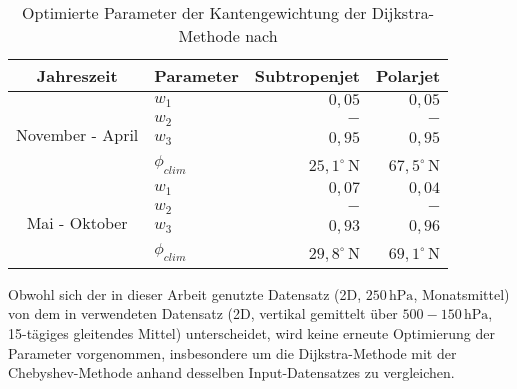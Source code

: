 \begin{table}[htb]
  \caption[Parameter der Kantengewichtung der Dijkstra-Methode]{Optimierte Parameter der Kantengewichtung der Dijkstra-Methode nach \citet{molnos-2017}}
\centering
\begin{tabular}{|cl|rr|}
  \hline
  Jahreszeit & Parameter & Subtropenjet & Polarjet \\
  \hline
  \multirow{4}{*}{November - April} 
    & $w_1$ & $0,05$ & $0,05$ \\
    & $w_2$ & $-$ & $-$ \\
    & $w_3$ & $0,95$ & $0,95$ \\
    & $\phi_{clim}$ & $25,1^{\circ}$\,N & $67,5^{\circ}$\,N \\
  \hline
  \multirow{4}{*}{Mai - Oktober} 
    & $w_1$ & $0,07$ & $0,04$ \\
    & $w_2$ & $-$ & $-$ \\
    & $w_3$ & $0,93$ & $0,96$ \\
    & $\phi_{clim}$ & $29,8^{\circ}$\,N & $69,1^{\circ}$\,N \\
  \hline
\end{tabular}
\label{tab:dijkstra}
\end{table}

Obwohl sich der in dieser Arbeit genutzte Datensatz (2D, $250\,\text{hPa}$, Monatsmittel) von dem in \citet{molnos-2017} verwendeten Datensatz (2D, vertikal gemittelt über $500-150\,\text{hPa}$, 15-tägiges gleitendes Mittel) unterscheidet, wird keine erneute Optimierung der Parameter vorgenommen, insbesondere um die Dijkstra-Methode mit der Chebyshev-Methode anhand desselben Input-Datensatzes zu vergleichen. 

